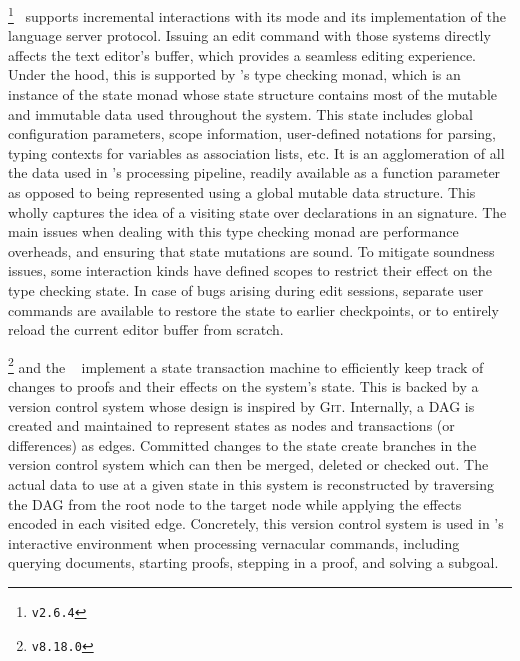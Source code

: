 \Agda\footnote{\Agda \texttt{v2.6.4}}~\cite{clffolp, norell2007towards, agda2023} supports incremental interactions with its \Agda mode and its implementation of the language server protocol.
Issuing an edit command with those systems directly affects the text editor's buffer, which provides a seamless editing experience.
Under the hood, this is supported by \Agda's type checking monad, which is an instance of the state monad whose state structure contains most of the mutable and immutable data used throughout the system.
This state includes global configuration parameters, scope information, user-defined notations for parsing, typing contexts for variables as association lists, etc.
It is an agglomeration of all the data used in \Agda's processing pipeline, readily available as a function parameter as opposed to being represented using a global mutable data structure.
This wholly captures the idea of a visiting state over declarations in an \Agda signature.
The main issues when dealing with this type checking monad are performance overheads, and ensuring that state mutations are sound.
To mitigate soundness issues, some interaction kinds have defined scopes to restrict their effect on the type checking state.
In case of bugs arising during edit sessions, separate user commands are available to restore the state to earlier checkpoints, or to entirely reload the current editor buffer from scratch.

\Coq\footnote{\Coq \texttt{v8.18.0}} and the \CoqIDE~\cite{Coq, bertot2013interactive} implement a state transaction machine to efficiently keep track of changes to proofs and their effects on the system's state.
This is backed by a version control system whose design is inspired by \textsc{Git}.
Internally, a \ac{DAG} is created and maintained to represent states as nodes and transactions (or differences) as edges.
Committed changes to the state create branches in the version control system which can then be merged, deleted or checked out.
The actual data to use at a given state in this system is reconstructed by traversing the \ac{DAG} from the root node to the target node while applying the effects encoded in each visited edge.
Concretely, this version control system is used in \Coq's interactive environment when processing vernacular commands, including querying documents, starting proofs, stepping in a proof, and solving a subgoal.


